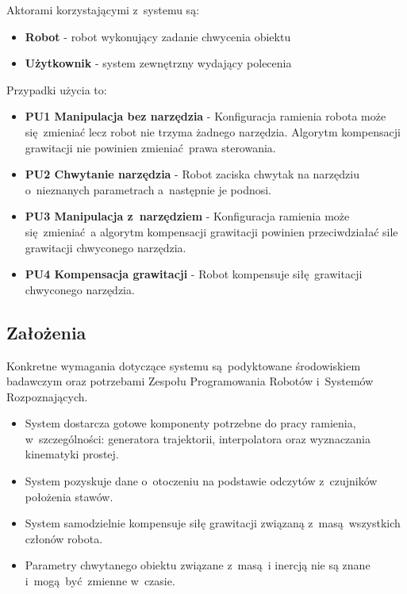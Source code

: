 Aktorami korzystającymi z~systemu są:
\begin{itemize}
	\item \textbf{Robot} - robot wykonujący zadanie chwycenia obiektu
	\item \textbf{Użytkownik} - system zewnętrzny wydający polecenia
\end{itemize}


Przypadki użycia to:
\begin{itemize}
	\item \textbf{PU1 Manipulacja bez narzędzia} - Konfiguracja ramienia robota może się zmieniać lecz robot nie trzyma żadnego narzędzia. Algorytm kompensacji grawitacji nie powinien zmieniać prawa sterowania. 
	\item \textbf{PU2 Chwytanie narzędzia} - Robot zaciska chwytak na narzędziu o~nieznanych parametrach a~następnie je podnosi.  
	\item \textbf{PU3 Manipulacja z~narzędziem} - Konfiguracja ramienia może się zmieniać a algorytm kompensacji grawitacji powinien przeciwdziałać sile grawitacji chwyconego narzędzia.
	\item \textbf{PU4 Kompensacja grawitacji} - Robot kompensuje siłę grawitacji chwyconego narzędzia.
\end{itemize}

\subsection{Założenia}
Konkretne wymagania dotyczące systemu są podyktowane środowiskiem badawczym oraz potrzebami Zespołu Programowania Robotów i~Systemów Rozpoznających. 
\begin{itemize}
	\item System dostarcza gotowe komponenty potrzebne do pracy ramienia, w~szczególności: generatora trajektorii, interpolatora oraz wyznaczania kinematyki prostej. 
	\item System pozyskuje dane o~otoczeniu na podstawie odczytów z~czujników położenia stawów.
	\item System samodzielnie kompensuje siłę grawitacji związaną z~masą wszystkich członów robota.
	\item Parametry chwytanego obiektu związane z~masą i inercją nie są znane i~mogą być zmienne w~czasie.
\end{itemize}

